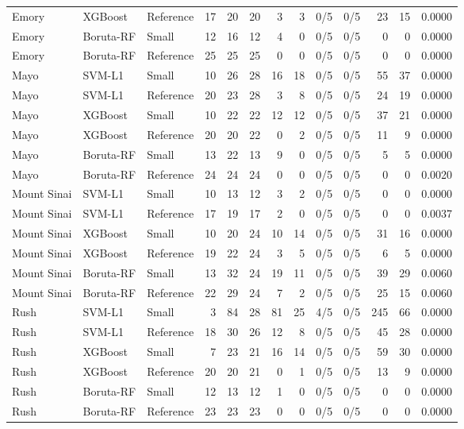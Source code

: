 \begin{table}[H]
{\begin{tabular}{lllrrrrrrrrrr}
Emory & XGBoost & Reference & 17 & 20 & 20 & 3 & 3 & 0/5 & 0/5 & 23 & 15 & 0.0000 \\
Emory & Boruta-RF & Small & 12 & 16 & 12 & 4 & 0 & 0/5 & 0/5 & 0 & 0 & 0.0000 \\
Emory & Boruta-RF & Reference & 25 & 25 & 25 & 0 & 0 & 0/5 & 0/5 & 0 & 0 & 0.0000 \\
\addlinespace[2pt]
Mayo & SVM-L1 & Small & 10 & 26 & 28 & 16 & 18 & 0/5 & 0/5 & 55 & 37 & 0.0000 \\
Mayo & SVM-L1 & Reference & 20 & 23 & 28 & 3 & 8 & 0/5 & 0/5 & 24 & 19 & 0.0000 \\
Mayo & XGBoost & Small & 10 & 22 & 22 & 12 & 12 & 0/5 & 0/5 & 37 & 21 & 0.0000 \\
Mayo & XGBoost & Reference & 20 & 20 & 22 & 0 & 2 & 0/5 & 0/5 & 11 & 9 & 0.0000 \\
Mayo & Boruta-RF & Small & 13 & 22 & 13 & 9 & 0 & 0/5 & 0/5 & 5 & 5 & 0.0000 \\
Mayo & Boruta-RF & Reference & 24 & 24 & 24 & 0 & 0 & 0/5 & 0/5 & 0 & 0 & 0.0020 \\
\addlinespace[2pt]
Mount Sinai & SVM-L1 & Small & 10 & 13 & 12 & 3 & 2 & 0/5 & 0/5 & 0 & 0 & 0.0000 \\
Mount Sinai & SVM-L1 & Reference & 17 & 19 & 17 & 2 & 0 & 0/5 & 0/5 & 0 & 0 & 0.0037 \\
Mount Sinai & XGBoost & Small & 10 & 20 & 24 & 10 & 14 & 0/5 & 0/5 & 31 & 16 & 0.0000 \\
Mount Sinai & XGBoost & Reference & 19 & 22 & 24 & 3 & 5 & 0/5 & 0/5 & 6 & 5 & 0.0000 \\
Mount Sinai & Boruta-RF & Small & 13 & 32 & 24 & 19 & 11 & 0/5 & 0/5 & 39 & 29 & 0.0060 \\
Mount Sinai & Boruta-RF & Reference & 22 & 29 & 24 & 7 & 2 & 0/5 & 0/5 & 25 & 15 & 0.0060 \\
\addlinespace[2pt]
Rush & SVM-L1 & Small & 3 & 84 & 28 & 81 & 25 & 4/5 & 0/5 & 245 & 66 & 0.0000 \\
Rush & SVM-L1 & Reference & 18 & 30 & 26 & 12 & 8 & 0/5 & 0/5 & 45 & 28 & 0.0000 \\
Rush & XGBoost & Small & 7 & 23 & 21 & 16 & 14 & 0/5 & 0/5 & 59 & 30 & 0.0000 \\
Rush & XGBoost & Reference & 20 & 20 & 21 & 0 & 1 & 0/5 & 0/5 & 13 & 9 & 0.0000 \\
Rush & Boruta-RF & Small & 12 & 13 & 12 & 1 & 0 & 0/5 & 0/5 & 0 & 0 & 0.0000 \\
Rush & Boruta-RF & Reference & 23 & 23 & 23 & 0 & 0 & 0/5 & 0/5 & 0 & 0 & 0.0000 \\
\bottomrule
\end{tabular}}
\end{table}

